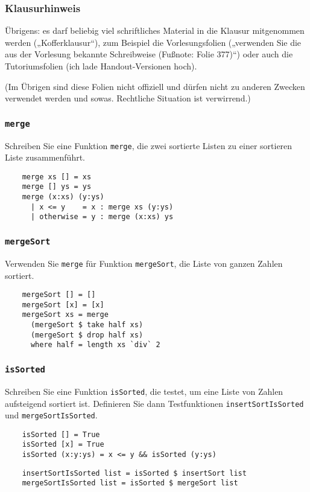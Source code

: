 \documentclass{beamer}
\begin{document}
\begin{frame}
  \frametitle{Klausurhinweis}
  Übrigens: es darf beliebig viel schriftliches Material in die Klausur mitgenommen werden („Kofferklausur“),
  zum Beispiel die Vorlesungsfolien („verwenden Sie die aus der Vorlesung bekannte Schreibweise (Fußnote: Folie 377)“)
  oder auch die Tutoriumsfolien (ich lade Handout-Versionen hoch).
  
  (Im Übrigen sind diese Folien nicht offiziell und dürfen nicht zu anderen Zwecken verwendet werden und sowas.
  Rechtliche Situation ist verwirrend.)
\end{frame}

\begin{frame}[fragile]
  \frametitle{\lstinline{merge}}
  Schreiben Sie eine Funktion \lstinline{merge}, die zwei sortierte Listen zu einer sortieren Liste zusammenführt.
  \pause
  \begin{lstlisting}
    merge xs [] = xs
    merge [] ys = ys
    merge (x:xs) (y:ys)
      | x <= y    = x : merge xs (y:ys)
      | otherwise = y : merge (x:xs) ys
  \end{lstlisting}
\end{frame}

\begin{frame}[fragile]
  \frametitle{\lstinline{mergeSort}}
  Verwenden Sie \lstinline{merge} für Funktion \lstinline{mergeSort}, die Liste von ganzen Zahlen sortiert.
  \pause
  \begin{lstlisting}
    mergeSort [] = []
    mergeSort [x] = [x]
    mergeSort xs = merge
      (mergeSort $ take half xs)
      (mergeSort $ drop half xs)
      where half = length xs `div` 2
  \end{lstlisting}
\end{frame}

\begin{frame}[fragile]
  \frametitle{\lstinline{isSorted}}
  Schreiben Sie eine Funktion \lstinline{isSorted}, die testet, um eine Liste von Zahlen aufsteigend sortiert ist.
  Definieren Sie dann Testfunktionen \lstinline{insertSortIsSorted} und \lstinline{mergeSortIsSorted}.
  \pause
  \begin{lstlisting}
    isSorted [] = True
    isSorted [x] = True
    isSorted (x:y:ys) = x <= y && isSorted (y:ys)
  \end{lstlisting}
  \pause
  \begin{lstlisting}
    insertSortIsSorted list = isSorted $ insertSort list
    mergeSortIsSorted list = isSorted $ mergeSort list
  \end{lstlisting}
\end{frame}
\end{document}
